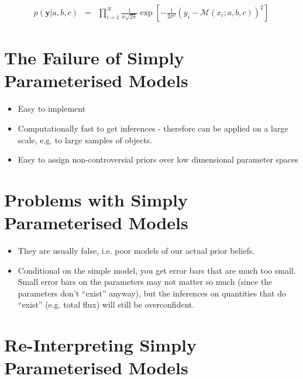 \documentclass[letterpaper, 11pt]{article}
\begin{document}
\begin{eqnarray}
p(\mathbf{y}|a, b, c) &=& \prod_{i=1}^N
\frac{1}{\sigma\sqrt{2\pi}}
\exp
\left[
-\frac{1}{2\sigma^2}\left(y_i - \mathcal{M}(x_i; a, b, c)\right)^2
\right]
\end{eqnarray}

\section{The Failure of Simply Parameterised Models}
\begin{itemize}
\item Easy to implement \\
\item Computationally fast to get inferences - therefore can be applied on a large scale, e.g. to large samples of objects. \\
\item Easy to assign non-controversial priors over low dimensional parameter spaces \\
\end{itemize}

\section{Problems with Simply Parameterised Models}
\begin{itemize}
\item They are usually false, i.e. poor models of our actual prior beliefs. \\
\item Conditional on the simple model, you get error bars that are much too small. Small error bars on the parameters may not matter so much (since the parameters don't ``exist'' anyway), but the inferences on quantities that do ``exist'' (e.g. total flux) will still be overconfident. \\
\end{itemize}

\section{Re-Interpreting Simply Parameterised Models}
\end{document}
